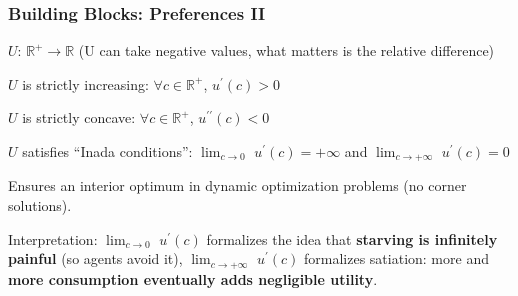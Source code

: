 \documentclass[xcolor=x11names,compress,aspectratio=169]{beamer}%
\makeatletter
\renewenvironment{itemize}{\begin{compactitemize}[<+-| alert@+>]}{\end{compactitemize}}
\makeatother
\begin{document}
\begin{frame}%
%

\frametitle{Building Blocks: Preferences II}%


\begin{itemize}
\item $U$: $\mathbb{R}^{+}\rightarrow\mathbb{R}$ (U can take negative values,
what matters is the relative difference)

\item $U$ is strictly increasing: $\forall c\in\mathbb{R}^{+}$, $u^{\prime
}\left(  c\right)  >0$

\item $U$ is strictly concave: $\forall c\in\mathbb{R}^{+}$, $u^{\prime\prime
}\left(  c\right)  <0$

\item $U$ satisfies \textquotedblleft Inada conditions\textquotedblright:
$\lim_{c\rightarrow0}$ $u^{\prime}\left(  c\right)  =+\infty$ and
$\lim_{c\rightarrow+\infty}$ $u^{\prime}\left(  c\right)  =0$

\begin{itemize}
\item Ensures an interior optimum in dynamic optimization problems (no corner solutions).

\item Interpretation: \newline$\lim_{c\rightarrow0}$ $u^{\prime}\left(
c\right)  $ formalizes the idea that\textbf{ starving is infinitely painful}
(so agents avoid it), \newline$\lim_{c\rightarrow+\infty}$ $u^{\prime}\left(
c\right)  $ formalizes satiation: more and \textbf{more consumption eventually
adds negligible utility}.
\end{itemize}
\end{itemize}

%

\transboxout
\end{frame}%
%
\end{document}
